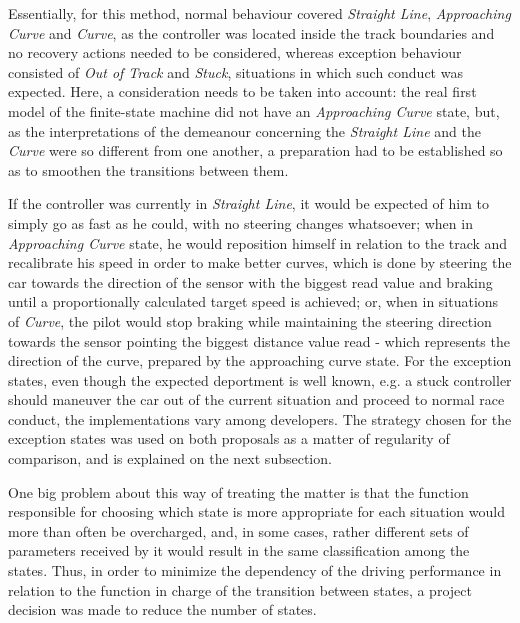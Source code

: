 	Essentially, for this method, normal behaviour covered \emph{Straight Line}, \emph{Approaching Curve} and
	\emph{Curve}, as the controller was located inside the track boundaries and no recovery actions needed to be
	considered, whereas exception behaviour consisted of \emph{Out of Track} and \emph{Stuck}, situations in which
	such conduct was expected. Here, a consideration needs to be taken into account: the real first model of the
	finite-state machine did not have an \emph{Approaching Curve} state, but, as the interpretations of the demeanour
	concerning the \emph{Straight Line} and the \emph{Curve} were so different from one another, a preparation had to
	be established so as to smoothen the transitions between them.
	
	If the controller was currently in \emph{Straight Line}, it would be expected of him to simply go as fast as he
	could, with no steering changes whatsoever; when in \emph{Approaching Curve} state, he would reposition himself
	in relation to the track and recalibrate his speed in order to make better curves, which is done by steering the
	car towards the direction of the sensor with the biggest read value and braking until a proportionally calculated
	target speed is achieved; or, when in situations of \emph{Curve}, the pilot would stop braking while maintaining
	the steering direction towards the sensor pointing the biggest distance value read - which represents the
	direction of the curve, prepared by the approaching curve state. For the exception states, even though the
	expected deportment is well known, e.g. a stuck controller should maneuver the car out of the current situation
	and proceed to normal race conduct, the implementations vary among developers. The strategy chosen for the
	exception states was used on both proposals as a matter of regularity of comparison, and is explained on the next
	subsection.
	
	One big problem about this way of treating the matter is that the function responsible for choosing which state
	is more appropriate for each situation would more than often be overcharged, and, in some cases, rather different
	sets of parameters received by it would result in the same classification among the states. Thus, in order to
	minimize the dependency of the driving performance in relation to the function in charge of the transition
	between states, a project decision was made to reduce the number of states.
		
